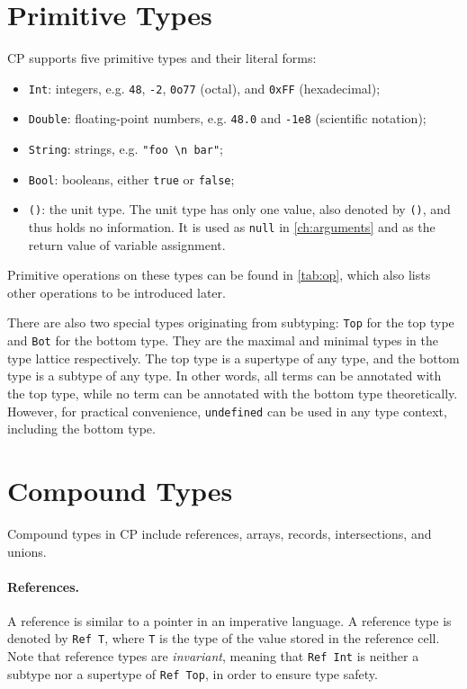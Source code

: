 \section{Primitive Types}

CP supports five primitive types and their literal forms: 
\begin{itemize}
\item \lstinline{Int}: integers, e.g. \lstinline{48}, \lstinline{-2}, \lstinline{0o77} (octal), and \lstinline{0xFF} (hexadecimal);
\item \lstinline{Double}: floating-point numbers, e.g. \lstinline{48.0} and \lstinline{-1e8} (scientific notation);
\item \lstinline{String}: strings, e.g. \lstinline{"foo \n bar"};
\item \lstinline{Bool}: booleans, either \lstinline{true} or \lstinline{false};
\item \lstinline{()}: the unit type. The unit type has only one value, also
      denoted by \lstinline{()}, and thus holds no information. It is used as
      \lstinline{null} in \autoref{ch:arguments} and as the return value of
      variable assignment.
\end{itemize}
Primitive operations on these types can be found in \autoref{tab:op}, which also
lists other operations to be introduced later.

There are also two special types originating from subtyping: \lstinline{Top} for
the top type and \lstinline{Bot} for the bottom type. They are the maximal and
minimal types in the type lattice respectively. The top type is a supertype of
any type, and the bottom type is a subtype of any type. In other words, all
terms can be annotated with the top type, while no term can be annotated with
the bottom type theoretically. However, for practical convenience,
\lstinline{undefined} can be used in any type context, including the bottom
type.

\section{Compound Types}

Compound types in CP include references, arrays, records, intersections, and
unions.

\paragraph{References.}
A reference is similar to a pointer in an imperative language. A reference type
is denoted by \lstinline{Ref T}, where \lstinline{T} is the type of the value
stored in the reference cell. Note that reference types are \emph{invariant},
meaning that \lstinline{Ref Int} is neither a subtype nor a supertype of
\lstinline{Ref Top}, in order to ensure type safety.

